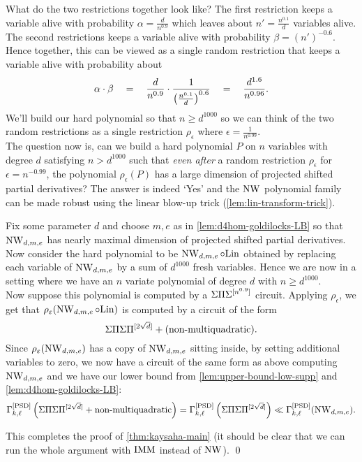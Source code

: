 What do the two restrictions together look like? The first restriction keeps a variable alive with probability $\alpha = \frac{d}{n^{0.9}}$ which leaves about $n' = \frac{n^{0.1}}{d}$ variables alive. The second restrictions keeps a variable alive with probability $\beta = (n')^{-0.6}$. Hence together, this can be viewed as a single random restriction that keeps a variable alive with probability about
\[
\alpha \cdot \beta \quad = \quad \frac{d}{n^{0.9}} \cdot \frac{1}{\left(\frac{n^{0.1}}{d}\right)^{0.6}} \quad = \quad \frac{d^{1.6}}{n^{0.96}}.
\]
We'll build our hard polynomial so that $n \geq d^{1000}$ so we can think of the two random restrictions as a single restriction $\rho_\epsilon$ where $\epsilon = \frac{1}{n^{0.99}}$.\\

The question now is, can we build a hard polynomial $P$ on $n$ variables with degree $d$ satisfying $n > d^{1000}$ such that \emph{even after} a random restriction $\rho_\epsilon$ for $\epsilon = n^{-0.99}$, the polynomial $\rho_\epsilon(P)$ has a large dimension of projected shifted partial derivatives? The answer is indeed `Yes' and the $\operatorname{\mathrm{NW}}$ polynomial family can be made robust using the linear blow-up trick (\autoref{lem:lin-transform-trick}). 

Fix some parameter $d$ and choose $m,e$ as in \autoref{lem:d4hom-goldilocks-LB} so that $\operatorname{\mathrm{NW}}_{d,m,e}$ has nearly maximal dimension of projected shifted partial derivatives. Now consider the hard polynomial to be $\operatorname{\mathrm{NW}}_{d,m,e} \circ \mathrm{Lin}$ obtained by replacing each variable of $\operatorname{\mathrm{NW}}_{d,m,e}$ by a sum of $d^{1000}$ fresh variables. Hence we are now in a setting where we have an $n$ variate polynomial of degree $d$ with $n \geq d^{1000}$. \\

Now suppose this polynomial is computed by a $\Sigma\Pi\Sigma^{[n^{0.9}]}$ circuit. Applying $\rho_\epsilon$, we get that $\rho_\varepsilon(\operatorname{\mathrm{NW}}_{d,m,e} \circ \mathrm{Lin})$ is computed by a circuit of the form 
\[
\Sigma\Pi\Sigma\Pi^{[2\sqrt{d}]} + (\text{non-multiquadratic}).
\]
Since $\rho_\varepsilon(\operatorname{\mathrm{NW}}_{d,m,e})$ has a copy of $\operatorname{\mathrm{NW}}_{d,m,e}$ sitting inside, by setting additional variables to zero, we now have a circuit of the same form as above computing $\operatorname{\mathrm{NW}}_{d,m,e}$ and we have our lower bound from \autoref{lem:upper-bound-low-supp} and \autoref{lem:d4hom-goldilocks-LB}:
\[
\Gamma^{\mathrm{[PSD]}}_{k,\ell}\left(\Sigma\Pi\Sigma\Pi^{[2\sqrt{d}]} + \text{non-multiquadratic}\right) =  \Gamma^{\mathrm{[PSD]}}_{k,\ell}\left(\Sigma\Pi\Sigma\Pi^{[2\sqrt{d}]}\right) \ll \Gamma^{\mathrm{[PSD]}}_{k,\ell}(\operatorname{\mathrm{NW}}_{d,m,e}). 
\]

This completes the proof of \autoref{thm:kaysaha-main} (it should be clear that we can run the whole argument with $\operatorname{\mathrm{IMM}}$ instead of $\operatorname{\mathrm{NW}}$). \qed\\


